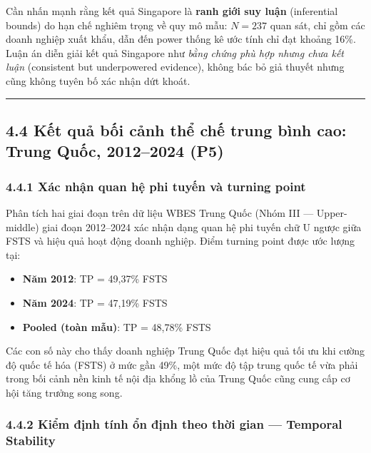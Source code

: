 \documentclass[12pt,a4paper]{article}
\providecommand{\tightlist}{\setlength{\itemsep}{0pt}\setlength{\parskip}{0pt}}
\begin{document}
Cần nhấn mạnh rằng kết quả Singapore là \textbf{ranh giới suy luận}
(inferential bounds) do hạn chế nghiêm trọng về quy mô mẫu: \(N = 237\)
quan sát, chỉ gồm các doanh nghiệp xuất khẩu, dẫn đến power thống kê ước
tính chỉ đạt khoảng 16\%. Luận án diễn giải kết quả Singapore như
\emph{bằng chứng phù hợp nhưng chưa kết luận} (consistent but
underpowered evidence), không bác bỏ giả thuyết nhưng cũng không tuyên
bố xác nhận dứt khoát.

\begin{center}\rule{0.5\linewidth}{0.5pt}\end{center}

\hypertarget{44-kux1ebft-quux1ea3-bux1ed1i-cux1ea3nh-thux1ec3-chux1ebf-trung-buxecnh-cao-trung-quux1ed1c-20122024-p5}{%
\subsection{4.4 Kết quả bối cảnh thể chế trung bình cao: Trung Quốc,
2012--2024
(P5)}\label{44-kux1ebft-quux1ea3-bux1ed1i-cux1ea3nh-thux1ec3-chux1ebf-trung-buxecnh-cao-trung-quux1ed1c-20122024-p5}}

\hypertarget{441-xuxe1c-nhux1eadn-quan-hux1ec7-phi-tuyux1ebfn-vuxe0-turning-point}{%
\subsubsection{4.4.1 Xác nhận quan hệ phi tuyến và turning
point}\label{441-xuxe1c-nhux1eadn-quan-hux1ec7-phi-tuyux1ebfn-vuxe0-turning-point}}

Phân tích hai giai đoạn trên dữ liệu WBES Trung Quốc (Nhóm III ---
Upper-middle) giai đoạn 2012--2024 xác nhận dạng quan hệ phi tuyến chữ U
ngược giữa FSTS và hiệu quả hoạt động doanh nghiệp. Điểm turning point
được ước lượng tại:

\begin{itemize}
\tightlist
\item
  \textbf{Năm 2012}: TP = 49,37\% FSTS
\item
  \textbf{Năm 2024}: TP = 47,19\% FSTS
\item
  \textbf{Pooled (toàn mẫu)}: TP = 48,78\% FSTS
\end{itemize}

Các con số này cho thấy doanh nghiệp Trung Quốc đạt hiệu quả tối ưu khi
cường độ quốc tế hóa (FSTS) ở mức gần 49\%, một mức độ tập trung quốc tế
vừa phải trong bối cảnh nền kinh tế nội địa khổng lồ của Trung Quốc cũng
cung cấp cơ hội tăng trưởng song song.

\hypertarget{442-kiux1ec3m-ux111ux1ecbnh-tuxednh-ux1ed5n-ux111ux1ecbnh-theo-thux1eddi-gian--temporal-stability}{%
\subsubsection{4.4.2 Kiểm định tính ổn định theo thời gian --- Temporal
Stability}\label{442-kiux1ec3m-ux111ux1ecbnh-tuxednh-ux1ed5n-ux111ux1ecbnh-theo-thux1eddi-gian--temporal-stability}}
\end{document}
